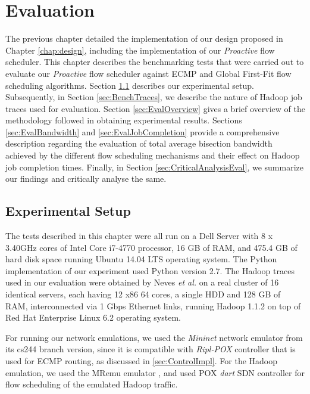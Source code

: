 \chapter{Evaluation} \label{chap:eval}

The previous chapter detailed the implementation of our design proposed in Chapter \ref{chap:design}, including the implementation of our \textit{Proactive} flow scheduler. This chapter describes the benchmarking tests that were carried out to evaluate our \textit{Proactive} flow scheduler against ECMP and Global First-Fit flow scheduling algorithms. Section \ref{sec:ExperiSetup} describes our experimental setup. Subsequently, in Section \ref{sec:BenchTraces}, we describe the nature of Hadoop job traces used for evaluation. Section \ref{sec:EvalOverview} gives a brief overview of the methodology followed in obtaining experimental results. Sections \ref{sec:EvalBandwidth} and \ref{sec:EvalJobCompletion} provide a comprehensive description regarding the evaluation of total average bisection bandwidth achieved by the different flow scheduling mechanisms and their effect on Hadoop job completion times. Finally, in Section \ref{sec:CriticalAnalysisEval}, we summarize our findings and critically analyse the same. 


\section{Experimental Setup} \label{sec:ExperiSetup}

The tests described in this chapter were all run on a Dell Server with 8 x 3.40GHz cores of Intel Core i7-4770 processor, 16 GB of RAM, and 475.4 GB of hard disk space running Ubuntu 14.04 LTS operating system. The Python implementation of our experiment used Python version 2.7. The Hadoop traces used in our evaluation were obtained by Neves \textit{et al.} \cite{neves2015mremu} on a real cluster of 16 identical servers, each having 12 x86 64
cores, a single HDD and 128 GB of RAM, interconnected via 1 Gbps Ethernet links, running Hadoop 1.1.2 on top of Red Hat Enterprise Linux 6.2 operating system. 

For running our network emulations, we used the \textit{Mininet} network emulator from its cs244 branch version, since it is compatible with \textit{Ripl-POX} controller that is used for ECMP routing, as discussed in \ref{sec:ControlImpl}. For the Hadoop emulation, we used the MRemu emulator \cite{MRemuRepo2015}, and used POX \textit{dart} \cite{POXdart} SDN controller for flow scheduling of the emulated Hadoop traffic.

